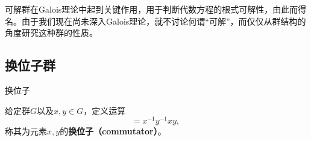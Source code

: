 


可解群在Galois理论中起到关键作用，用于判断代数方程的根式可解性，由此而得名。由于我们现在尚未深入Galois理论，就不讨论何谓“可解”，而仅仅从群结构的角度研究这种群的性质。



\subsection{换位子群}


\begin{definition}{换位子}

给定群$G$以及$x, y\in G$，定义运算
\begin{equation}
[x, y] = x^{-1}y^{-1}xy,~
\end{equation}
称其为元素$x, y$的\textbf{换位子（commutator）}。

\end{definition}



































